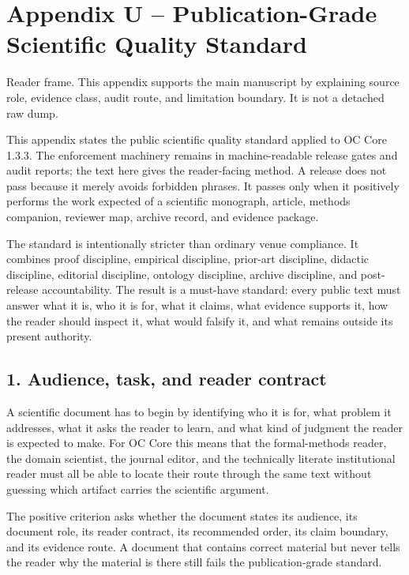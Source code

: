 \section{Appendix U -- Publication-Grade Scientific Quality Standard}
Reader frame. This appendix supports the main manuscript by explaining source role, evidence class, audit route, and limitation boundary. It is not a detached raw dump.


\label{sec:oc133-public-scientific-quality-standard}

This appendix states the public scientific quality standard applied to OC Core 1.3.3. The enforcement machinery remains in machine-readable release gates and audit reports; the text here gives the reader-facing method. A release does not pass because it merely avoids forbidden phrases. It passes only when it positively performs the work expected of a scientific monograph, article, methods companion, reviewer map, archive record, and evidence package.


The standard is intentionally stricter than ordinary venue compliance. It combines proof discipline, empirical discipline, prior-art discipline, didactic discipline, editorial discipline, ontology discipline, archive discipline, and post-release accountability. The result is a must-have standard: every public text must answer what it is, who it is for, what it claims, what evidence supports it, how the reader should inspect it, what would falsify it, and what remains outside its present authority.


\subsection{1. Audience, task, and reader contract}

A scientific document has to begin by identifying who it is for, what problem it addresses, what it asks the reader to learn, and what kind of judgment the reader is expected to make. For OC Core this means that the formal-methods reader, the domain scientist, the journal editor, and the technically literate institutional reader must all be able to locate their route through the same text without guessing which artifact carries the scientific argument.


The positive criterion asks whether the document states its audience, its document role, its reader contract, its recommended order, its claim boundary, and its evidence route. A document that contains correct material but never tells the reader why the material is there still fails the publication-grade standard.


